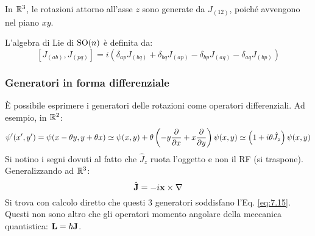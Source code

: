 \begin{example}
	In $ \mathbb{R}^3 $, le rotazioni attorno all'asse $ z $ sono generate da $ J_{(12)} $, poiché avvengono nel piano $ xy $.
\end{example}

\begin{proposition}
	L'algebra di Lie di $ \mathrm{SO}(n) $ è definita da:
	\begin{equation}
		\left[ J_{(ab)},J_{(pq)} \right] = i \left( \delta_{ap} J_{(bq)} + \delta_{bq} J_{(ap)} - \delta_{bp} J_{(aq)} - \delta_{aq} J_{(bp)} \right)
		\label{eq:7.20}
	\end{equation}
\end{proposition}

\subsubsection{Generatori in forma differenziale}

È possibile esprimere i generatori delle rotazioni come operatori differenziali. Ad esempio, in $ \mathbb{R}^2 $:
\begin{equation*}
	\psi'(x',y') = \psi(x - \theta y, y + \theta x) \simeq \psi(x,y) + \theta \left( - y \frac{\partial}{\partial x} + x \frac{\partial}{\partial y} \right) \psi(x,y) \simeq \left( 1 + i \theta \hat{J}_z \right) \psi(x,y)
\end{equation*}
Si notino i segni dovuti al fatto che $ \hat{J}_z $ ruota l'oggetto e non il RF (si traspone).\\
Generalizzando ad $ \mathbb{R}^3 $:
\begin{equation}
	\hat{\mathbf{J}} = - i \mathbf{x} \times \nabla
	\label{eq:7.21}
\end{equation}
Si trova con calcolo diretto che questi 3 generatori soddisfano l'Eq. \ref{eq:7.15}. Questi non sono altro che gli operatori momento angolare della meccanica quantistica: $ \mathbf{L} = \hbar \mathbf{J} $.










